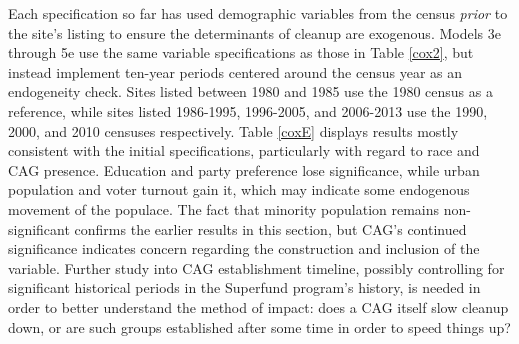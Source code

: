 \documentclass[12pt]{article}
\begin{document}
Each specification so far has used demographic variables from the census \emph{prior} to the site's listing to ensure the determinants of cleanup are exogenous. Models 3e through 5e use the same variable specifications as those in Table \ref{cox2}, but instead implement ten-year periods centered around the census year as an endogeneity check. Sites listed between 1980 and 1985 use the 1980 census as a reference, while sites listed 1986-1995, 1996-2005, and 2006-2013 use the 1990, 2000, and 2010 censuses respectively. Table \ref{coxE} displays results mostly consistent with the initial specifications, particularly with regard to race and CAG presence. Education and party preference lose significance, while urban population and voter turnout gain it, which may indicate some endogenous movement of the populace. The fact that minority population remains non-significant confirms the earlier results in this section, but CAG's continued significance indicates concern regarding the construction and inclusion of the variable. Further study into CAG establishment timeline, possibly controlling for significant historical periods in the Superfund program's history, is needed in order to better understand the method of impact: does a CAG itself slow cleanup down, or are such groups established after some time in order to speed things up?
\end{document}
